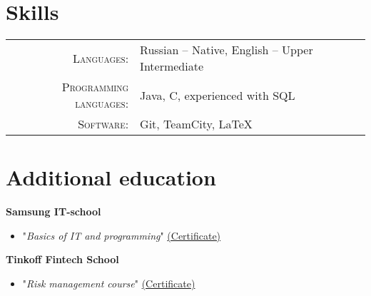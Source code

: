 \documentclass[a4paper,10pt]{article}
\begin{document}
\section{Skills}
\begin{tabular}{rl}
    \textsc{Languages}: & Russian -- Native, English -- Upper Intermediate\\
    \textsc{Programming languages}: & Java, C, experienced with SQL \\
    \textsc{Software}: & Git, TeamCity, \LaTeX \\
\end{tabular}

\section{Additional education}
    
    \textbf{Samsung IT-school}     
    \begin{itemize}
        \item "\textit{Basics of IT and programming}" 
        \href{https://olegvelikanov.github.io/src/samsung_it_school_certificate.png}{ \footnotesize (Certificate)}
    \end{itemize} 
    
    \textbf{Tinkoff Fintech School}     
    \begin{itemize}
        \item "\textit{Risk management course}" 
        \href{https://olegvelikanov.github.io/src/Tinkoff_fintech_school_certificate.jpeg}{ \footnotesize (Certificate)}
    \end{itemize} 
\end{document}
